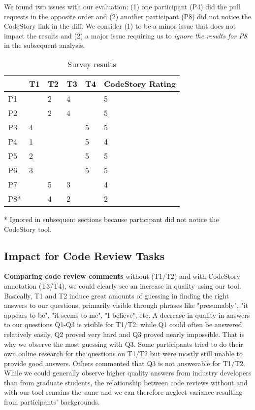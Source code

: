 \documentclass[../manifest.tex]{subfiles}
\begin{document}
We found two issues with our evaluation: (1) one participant (P4) did the pull requests in the opposite order and (2) another participant (P8) did not notice the CodeStory link in the diff. We consider (1) to be a minor issue that does not impact the results and (2) a major issue requiring us to \textit{ignore the results for P8} in the subsequent analysis.

\begin{table*}[t]
    \centering
    \begin{threeparttable}
    \begin{tabular*}{\textwidth}{llllll}
    \hline
    \textbf{} & \textbf{T1} & \textbf{T2} & \textbf{T3} & \textbf{T4} & \textbf{CodeStory Rating} \\
    \hline
    P1  &   & 2 & 4 &   & 5 \\
    P2  &   & 2 & 4 &   & 5 \\
    P3  & 4 &   &   & 5 & 5 \\
    P4  & 1 &   &   & 5 & 4 \\
    P5  & 2 &   &   & 5 & 5 \\
    P6  & 3 &   &   & 5 & 5 \\
    P7  &   & 5 & 3 &   & 4 \\
    P8* &   & 4 & 2 &   & 2 \\
    \hline
    \end{tabular*}
    \begin{tablenotes}\footnotesize
      \item [*] Ignored in subsequent sections because participant did not notice the CodeStory tool.
    \end{tablenotes}
    \end{threeparttable}
    \caption{Survey results}
    \label{tab:survey-results}
\end{table*}

\subsection{Impact for Code Review Tasks} \label{eval-impact}

\textbf{Comparing code review comments} without (T1/T2) and with CodeStory annotation (T3/T4), we could clearly see an increase in quality using our tool. Basically, T1 and T2 induce great amounts of guessing in finding the right answers to our questions, primarily visible through phrases like "presumably", "it appears to be", "it seems to me", "I believe", etc. A decrease in quality in answers to our questions Q1-Q3 is visible for T1/T2: while Q1 could often be answered relatively easily, Q2 proved very hard and Q3 proved nearly impossible. That is why we observe the most guessing with Q3. Some participants tried to do their own online research for the questions on T1/T2 but were mostly still unable to provide good answers. Others commented that Q3 is not answerable for T1/T2. While we could generally observe higher quality answers from industry developers than from graduate students, the relationship between code reviews without and with our tool remains the same and we can therefore neglect variance resulting from participants' backgrounds.
\end{document}

